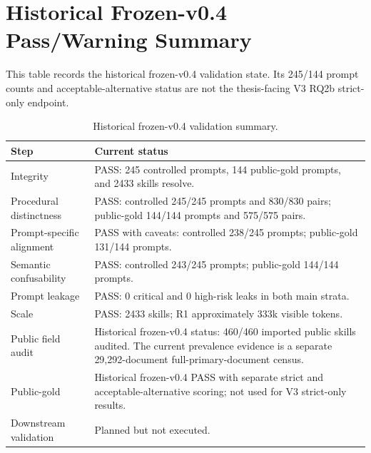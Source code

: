 \section{Historical Frozen-v0.4 Pass/Warning Summary}

This table records the historical frozen-v0.4 validation state. Its 245/144 prompt counts and acceptable-alternative status are not the thesis-facing V3 RQ2b strict-only endpoint.

\begin{table}[h]
\centering
\begin{tabular}{p{}p{}}
\toprule
Step & Current status \\
\midrule
Integrity & PASS: 245 controlled prompts, 144 public-gold prompts, and 2433 skills resolve. \\
Procedural distinctness & PASS: controlled 245/245 prompts and 830/830 pairs; public-gold 144/144 prompts and 575/575 pairs. \\
Prompt-specific alignment & PASS with caveats: controlled 238/245 prompts; public-gold 131/144 prompts. \\
Semantic confusability & PASS: controlled 243/245 prompts; public-gold 144/144 prompts. \\
Prompt leakage & PASS: 0 critical and 0 high-risk leaks in both main strata. \\
Scale & PASS: 2433 skills; R1 approximately 333k visible tokens. \\
Public field audit & Historical frozen-v0.4 status: 460/460 imported public skills audited. The current prevalence evidence is a separate 29,292-document full-primary-document census. \\
Public-gold & Historical frozen-v0.4 PASS with separate strict and acceptable-alternative scoring; not used for V3 strict-only results. \\
Downstream validation & Planned but not executed. \\
\bottomrule
\end{tabular}
\caption{Historical frozen-v0.4 validation summary.}
\end{table}
